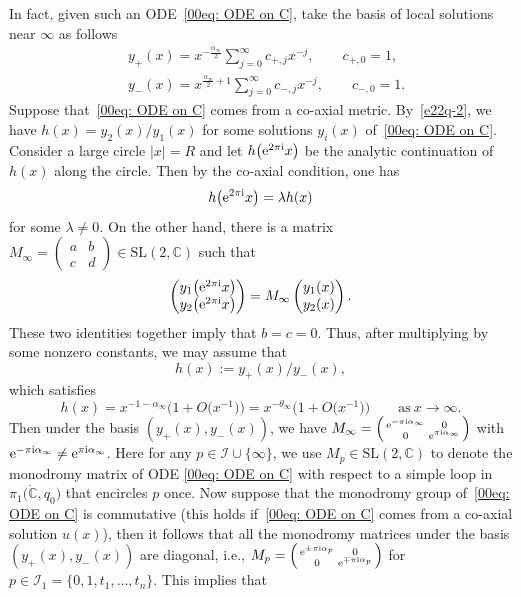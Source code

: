 \documentclass[10pt,a4paper]{amsart}
\numberwithin{equation}{section}
\def\SL{\mathrm{SL}}
\def\C{\mathbb C}
\def\SL{\mathrm{SL}}
\def\SM#1#2#3#4{\left(\begin{smallmatrix}#1&#2\\#3&#4\end{smallmatrix}
 \right)}
\begin{document}
In fact, given such an ODE~\eqref{00eq: ODE on C}, take the basis of local solutions near $\infty$ as follows
\begin{align}
&y_{+}(x)=x^{-\frac{\alpha_\infty}{2}}\sum_{j=0}^\infty c_{+,j}x^{-j},\qquad c_{+,0}=1, \nonumber\\
&y_{-}(x)=x^{\frac{\alpha_\infty}{2}+1}\sum_{j=0}^\infty
c_{-,j}x^{-j},\qquad c_{-,0}=1. \label{00e0q-y+}
\end{align}
Suppose that~\eqref{00eq: ODE on C} comes from a co-axial metric.
By~\eqref{e22q-2}, we have $h(x)=y_2(x)/y_1(x)$ for some solutions
$y_i(x)$ of~\eqref{00eq: ODE on C}. Consider a large circle $|x|=R$
and let $h\bigl({\rm e}^{2\pi {\rm i}}x\bigr)$ be the analytic continuation of $h(x)$ along
the circle. Then by the co-axial condition, one has
\[
h\bigl({\rm e}^{2\pi {\rm i}}x\bigr)=\lambda h(x)
\]
for some $\lambda\neq 0$. On the other hand, there is a matrix
$M_\infty=\SM abcd\in\SL(2,\C)$ such that
\[
\begin{pmatrix}
 y_1\bigl({\rm e}^{2\pi {\rm i}}x\bigr) \\y_2\bigl({\rm e}^{2\pi {\rm i}}x\bigr) \end{pmatrix}
=M_\infty\begin{pmatrix}y_1(x)\\y_2(x)\end{pmatrix}.
\]
These two identities together imply that $b=c=0$. Thus, after
multiplying by some nonzero constants, we may assume that
\begin{equation}\label{200h}
 h(x):=y_{+}(x)/y_{-}(x),
\end{equation}
which satisfies
\begin{equation}
 \label{h-infty}h(x)=x^{-1-\alpha_\infty}\bigl(1+O\bigl(x^{-1}\bigr)\bigr)=x^{-\theta_\infty}\bigl(1+O\bigl(x^{-1}\bigr)\bigr)\qquad
 \text{as}\ x\to\infty.
\end{equation}
Then under the basis $(y_{+}(x), y_{-}(x))$, we have
$M_{\infty}=\SM{{\rm e}^{-\pi {\rm i} \alpha_\infty}}{0}{0}{{\rm e}^{\pi {\rm i}
 \alpha_\infty}}$ with ${\rm e}^{-\pi {\rm i} \alpha_\infty}\neq {\rm e}^{\pi {\rm i}
 \alpha_\infty}$. Here for any $p\in \mathcal{I}\cup\{\infty\}$, we
use $M_p\in\SL(2,\mathbb{C})$ to denote the monodromy matrix of ODE
\eqref{00eq: ODE on C} with respect to a simple loop in
$\pi_1\bigl(\dot{\C}, q_0\bigr)$ that encircles $p$ once.
Now suppose that the monodromy group of~\eqref{00eq: ODE on C} is commutative (this holds if~\eqref{00eq: ODE on C} comes from a co-axial solution $u(x)$), then it follows that all the monodromy matrices under the basis $(y_{+}(x), y_{-}(x))$ are diagonal, i.e., $M_{p}=\SM{{\rm e}^{\pm\pi {\rm i} \alpha_{p}}}{0}{0}{{\rm e}^{\mp\pi {\rm i} \alpha_{p}}}$ for $p\in \mathcal{I}_1=\{0,1,t_1,\dots,t_n\}$. This implies that
\end{document}
